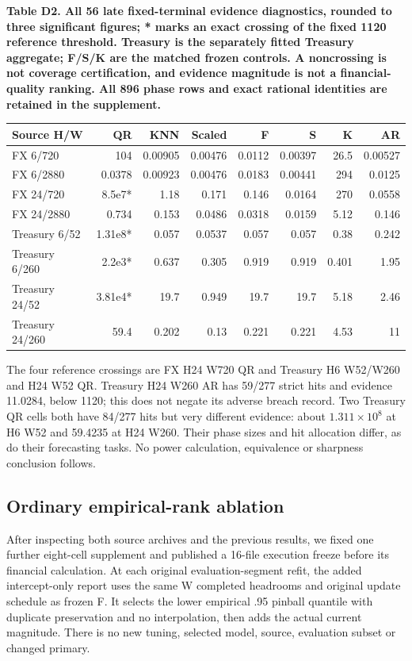 \documentclass[10pt,a4paper]{article}
\begin{document}
\begin{center}
\begin{minipage}{\linewidth}
\small\textbf{Table D2. All 56 late fixed-terminal evidence diagnostics, rounded to three significant figures; * marks an exact crossing of the fixed 1120 reference threshold. Treasury is the separately fitted Treasury aggregate; F/S/K are the matched frozen controls. A noncrossing is not coverage certification, and evidence magnitude is not a financial-quality ranking. All 896 phase rows and exact rational identities are retained in the supplement.}\par\medskip
\centering\fontsize{8}{10}\selectfont
\begin{tabular}{lrrrrrrr}
\toprule
Source H/W & QR & KNN & Scaled & F & S & K & AR \\
\midrule
FX 6/720 & 104 & 0.00905 & 0.00476 & 0.0112 & 0.00397 & 26.5 & 0.00527 \\
FX 6/2880 & 0.0378 & 0.00923 & 0.00476 & 0.0183 & 0.00441 & 294 & 0.0125 \\
FX 24/720 & 8.5e7* & 1.18 & 0.171 & 0.146 & 0.0164 & 270 & 0.0558 \\
FX 24/2880 & 0.734 & 0.153 & 0.0486 & 0.0318 & 0.0159 & 5.12 & 0.146 \\
Treasury 6/52 & 1.31e8* & 0.057 & 0.0537 & 0.057 & 0.057 & 0.38 & 0.242 \\
Treasury 6/260 & 2.2e3* & 0.637 & 0.305 & 0.919 & 0.919 & 0.401 & 1.95 \\
Treasury 24/52 & 3.81e4* & 19.7 & 0.949 & 19.7 & 19.7 & 5.18 & 2.46 \\
Treasury 24/260 & 59.4 & 0.202 & 0.13 & 0.221 & 0.221 & 4.53 & 11 \\
\bottomrule
\end{tabular}
\end{minipage}
\end{center}
The four reference crossings are FX H24 W720 QR and Treasury H6 W52/W260 and H24 W52 QR. Treasury H24 W260 AR has 59/277 strict hits and evidence 11.0284, below 1120; this does not negate its adverse breach record. Two Treasury QR cells both have 84/277 hits but very different evidence: about \(1.311\times10^8\) at H6 W52 and 59.4235 at H24 W260. Their phase sizes and hit allocation differ, as do their forecasting tasks. No power calculation, equivalence or sharpness conclusion follows.

\subsection*{Ordinary empirical-rank ablation}
After inspecting both source archives and the previous results, we fixed one further eight-cell supplement and published a 16-file execution freeze before its financial calculation. At each original evaluation-segment refit, the added intercept-only report uses the same W completed headrooms and original update schedule as frozen F. It selects the lower empirical .95 pinball quantile with duplicate preservation and no interpolation, then adds the actual current magnitude. There is no new tuning, selected model, source, evaluation subset or changed primary.
\end{document}
